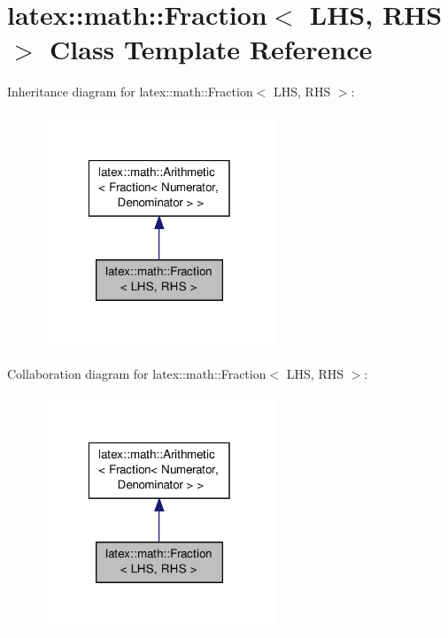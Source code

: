 \hypertarget{classlatex_1_1math_1_1Fraction}{\section{latex\-:\-:math\-:\-:Fraction$<$ L\-H\-S, R\-H\-S $>$ Class Template Reference}
\label{classlatex_1_1math_1_1Fraction}
}


Inheritance diagram for latex\-:\-:math\-:\-:Fraction$<$ L\-H\-S, R\-H\-S $>$\-:
\nopagebreak
\begin{figure}[H]
\begin{center}
\leavevmode
\includegraphics[width=198pt]{classlatex_1_1math_1_1Fraction__inherit__graph}
\end{center}
\end{figure}


Collaboration diagram for latex\-:\-:math\-:\-:Fraction$<$ L\-H\-S, R\-H\-S $>$\-:
\nopagebreak
\begin{figure}[H]
\begin{center}
\leavevmode
\includegraphics[width=198pt]{classlatex_1_1math_1_1Fraction__coll__graph}
\end{center}
\end{figure}
